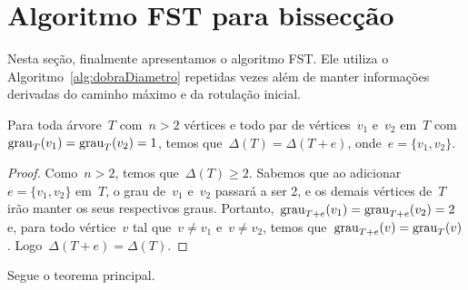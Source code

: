 \section {Algoritmo FST para bissecção}

	Nesta seção, finalmente apresentamos o algoritmo FST.
	Ele utiliza o Algoritmo~\ref{alg:dobraDiametro} 
	repetidas vezes além de manter informações derivadas
	do caminho máximo e da rotulação inicial.

	\begin{prop}
	\label{lem:grauMaximo}
		Para toda árvore~$T$ com~${n>2}$ vértices
		e todo par de vértices~$v_1$ e~$v_2$ em~$T$ 
		com~${\mathrm{grau}_T(v_1)=\mathrm{grau}_T(v_2)=1}$,
		temos que~${\Delta(T) = \Delta(T+ e)}$,
		onde~$e=\{v_1, v_2\}$.
	\end{prop}
	
	
	\begin{proof}
		Como~${n>2}$, temos que~${\Delta(T)\ge 2}$.
		Sabemos que ao adicionar~${e = \{v_1,v_2\}}$ em~$T$, 
		o grau de~$v_1$
		e~$v_2$ passará a ser 2, e os demais vértices de~$T$
		irão manter os seus respectivos graus.
		Portanto,~${\mathrm{grau}_{T+e}(v_1)=\mathrm{grau}_{T+ e}(v_2)=2}$
		e, para todo vértice~$v$ tal que~$v\ne v_1$ e~$v\ne v_2$,
		temos que~${\mathrm{grau}_{T+ e}(v)=\mathrm{grau}_T(v)}$.
		Logo~$\Delta(T+e) = \Delta(T)$.
	\end{proof}

	\bigskip

	Segue o teorema principal.

